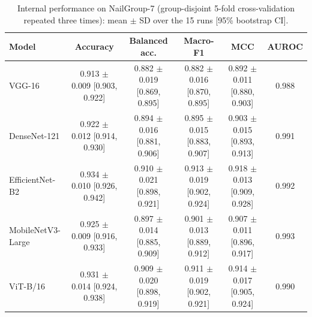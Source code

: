 \begin{table}[!tbp]
\centering
\caption{Internal performance on NailGroup-7 (group-disjoint 5-fold cross-validation repeated three times): mean $\pm$ SD over the 15 runs [95\% bootstrap CI].}
\label{tab:internal}
\footnotesize
\begin{tabular}{lccccc}
\hline
Model & Accuracy & Balanced acc. & Macro-F1 & MCC & AUROC \\
\hline
VGG-16 & 0.913 $\pm$ 0.009 [0.903, 0.922] & 0.882 $\pm$ 0.019 [0.869, 0.895] & 0.882 $\pm$ 0.016 [0.870, 0.895] & 0.892 $\pm$ 0.011 [0.880, 0.903] & 0.988 \\
DenseNet-121 & 0.922 $\pm$ 0.012 [0.914, 0.930] & 0.894 $\pm$ 0.016 [0.881, 0.906] & 0.895 $\pm$ 0.015 [0.883, 0.907] & 0.903 $\pm$ 0.015 [0.893, 0.913] & 0.991 \\
EfficientNet-B2 & 0.934 $\pm$ 0.010 [0.926, 0.942] & 0.910 $\pm$ 0.021 [0.898, 0.921] & 0.913 $\pm$ 0.019 [0.902, 0.924] & 0.918 $\pm$ 0.013 [0.909, 0.928] & 0.992 \\
MobileNetV3-Large & 0.925 $\pm$ 0.009 [0.916, 0.933] & 0.897 $\pm$ 0.014 [0.885, 0.909] & 0.901 $\pm$ 0.013 [0.889, 0.912] & 0.907 $\pm$ 0.011 [0.896, 0.917] & 0.993 \\
ViT-B/16 & 0.931 $\pm$ 0.014 [0.924, 0.938] & 0.909 $\pm$ 0.020 [0.898, 0.919] & 0.911 $\pm$ 0.019 [0.902, 0.921] & 0.914 $\pm$ 0.017 [0.905, 0.924] & 0.990 \\
\hline
\end{tabular}
\end{table}